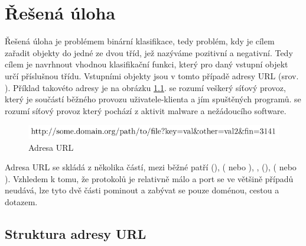\chapter{Řešená úloha}\label{problem}

Řešená úloha je problémem binární klasifikace, tedy problém, kdy je cílem zařadit objekty do jedné ze dvou tříd, jež nazýváme pozitivní a negativní. Tedy cílem je navrhnout vhodnou klasifikační funkci, který pro daný vstupní objekt určí příslušnou třídu. Vstupními objekty jsou v tomto případě adresy URL (srov. \cite{berners-lee_uniform_1994}). Příklad takovéto adresy je na obrázku \ref{url}.  se rozumí veškerý síťový provoz, který je součástí běžného provozu uživatele-klienta a jím spuštěných programů.  se rozumí síťový provoz který pochází z aktivit malware a nežádoucího software.

\begin{figure}[h]
	\centering
	\includegraphics{images/url/url.pdf}
	\caption{Adresa URL}\label{url}
\end{figure}

Adresa URL se skládá z několika částí, mezi běžné patří  (),  ( nebo ), ,  (),  ( nebo ). Vzhledem k tomu, že protokolů je relativně málo a port se ve většině případů neudává, lze tyto dvě části pominout a zabývat se pouze doménou, cestou a dotazem.

\section{Struktura adresy URL}\label{URL_structure}

